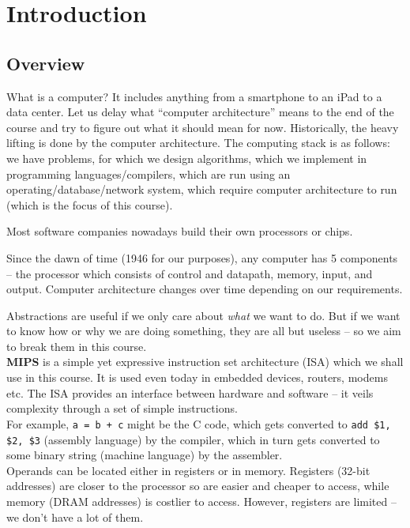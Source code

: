 \documentclass{article}
\begin{document}
\thispagestyle{empty}
\titleBC

\tableofcontents
\clearpage


\section{Introduction}

	\subsection{Overview}

		What is a computer? It includes anything from a smartphone to an iPad to a data center. Let us delay what ``computer architecture'' means to the end of the course and try to figure out what it should mean for now. Historically, the heavy lifting is done by the computer architecture. The computing stack is as follows: we have problems, for which we design algorithms, which we implement in programming languages/compilers, which are run using an operating/database/network system, which require computer architecture to run (which is the focus of this course).

		Most software companies nowadays build their own processors or chips.

		Since the dawn of time (1946 for our purposes), any computer has 5 components -- the processor which consists of control and datapath, memory, input, and output. Computer architecture changes over time depending on our requirements.

		Abstractions are useful if we only care about \emph{what} we want to do. But if we want to know how or why we are doing something, they are all but useless -- so we aim to break them in this course.\\

		\textbf{MIPS} is a simple yet expressive instruction set architecture (ISA) which we shall use in this course. It is used even today in embedded devices, routers, modems etc. The ISA provides an interface between hardware and software -- it veils complexity through a set of simple instructions.\\
		For example, \texttt{a = b + c} might be the C code, which gets converted to \texttt{add \$1, \$2, \$3} (assembly language) by the compiler, which in turn gets converted to some binary string (machine language) by the assembler.\\
		Operands can be located either in registers or in memory. Registers (32-bit addresses) are closer to the processor so are easier and cheaper to access, while memory (DRAM addresses) is costlier to access. However, registers are limited -- we don't have a lot of them.
\end{document}
